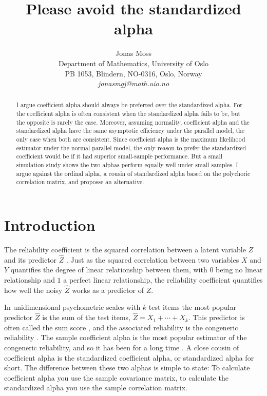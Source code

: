 \documentclass[twoside]{article}
\title{Please avoid the standardized alpha}
\author{
  Jonas Moss \orcid{0000-0002-6876-6964} \\
  Department of Mathematics, University of Oslo\\
  PB 1053, Blindern, NO-0316, Oslo, Norway \\
  \it{jonasmgj@math.uio.no}
}
\begin{document}
\maketitle

\begin{abstract}
I argue coefficient alpha should always be preferred over the standardized alpha. For the coefficient alpha is often consistent when the standardized alpha fails to be, but the opposite is rarely the case. Moreover, assuming normality, coefficient alpha and the standardized alpha have the same asymptotic efficiency under the parallel model, the only case when both are consistent. Since coefficient alpha is the maximum likelihood estimator under the normal parallel model, the only reason to prefer the standardized coefficient would be if it had superior small-sample performance. But a small simulation study shows the two alphas perform equally well under small samples. I argue against the ordinal alpha, a cousin of standardized alpha based on the polychoric correlation matrix, and proposse an alternative.
\end{abstract}


\section{Introduction}
The reliability coefficient is the squared correlation between a latent variable $Z$ and its predictor $\hat{Z}$ \citep[][p. 61]{Lord1968-ax}. Just as the squared correlation between two variables $X$ and $Y$ quantifies the degree of linear relationship between them, with $0$ being no linear relationship and $1$ a perfect linear relationship, the reliability coefficient quantifies how well the noisy $\hat{Z}$ works as a predictor of $Z$.

In unidimensional psychometric scales with $k$ test items the most popular predictor $\hat{Z}$ is the sum of the test items, $\hat{Z}=X_1 + \cdots + X_k$. This predictor is often called the sum score \citep{McNeish2019-ea}, and the associated reliability is the congeneric reliability \citep{Cho2016-bs}. The sample coefficient alpha is the most popular estimator of the congeneric reliability, and so it has been for a long time \citep{McNeish2018-vu}. A close cousin of coefficient alpha is the standardized coefficient alpha, or standardized alpha for short. The difference between these two alphas is simple to state: To calculate coefficient alpha you use the sample covariance matrix, to calculate the standardized alpha you use the sample correlation matrix.
\end{document}
